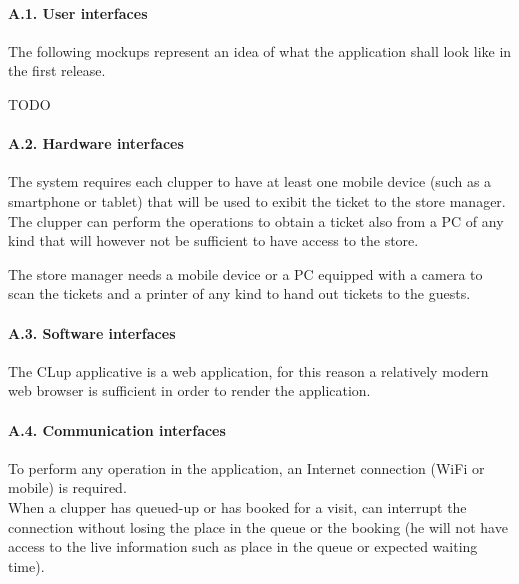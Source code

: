 \hypertarget{a.1.-user-interfaces}{%
\paragraph{A.1. User interfaces}\label{a.1.-user-interfaces}}

The following mockups represent an idea of what the application shall
look like in the first release.

TODO

\hypertarget{a.2.-hardware-interfaces}{%
\paragraph{A.2. Hardware interfaces}\label{a.2.-hardware-interfaces}}

The system requires each clupper to have at least one mobile device
(such as a smartphone or tablet) that will be used to exibit the ticket
to the store manager.\\
The clupper can perform the operations to obtain a ticket also from a PC
of any kind that will however not be sufficient to have access to the
store.

The store manager needs a mobile device or a PC equipped with a camera
to scan the tickets and a printer of any kind to hand out tickets to the
guests.

\hypertarget{a.3.-software-interfaces}{%
\paragraph{A.3. Software interfaces}\label{a.3.-software-interfaces}}

The CLup applicative is a web application, for this reason a relatively
modern web browser is sufficient in order to render the application.

\hypertarget{a.4.-communication-interfaces}{%
\paragraph{A.4. Communication
interfaces}\label{a.4.-communication-interfaces}}

To perform any operation in the application, an Internet connection
(WiFi or mobile) is required.\\
When a clupper has queued-up or has booked for a visit, can interrupt
the connection without losing the place in the queue or the booking (he
will not have access to the live information such as place in the queue
or expected waiting time).

